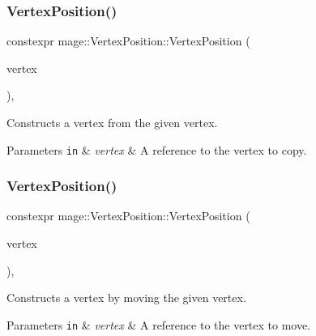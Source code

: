 \subsubsection{\texorpdfstring{Vertex\+Position()}{VertexPosition()}\hspace{0.1cm}{\footnotesize\ttfamily [3/4]}}
{\footnotesize\ttfamily constexpr mage\+::\+Vertex\+Position\+::\+Vertex\+Position (\begin{DoxyParamCaption}\item[{const \hyperlink{structmage_1_1_vertex_position}{Vertex\+Position} \&}]{vertex }\end{DoxyParamCaption})\hspace{0.3cm}{\ttfamily [default]}, {\ttfamily [noexcept]}}

Constructs a vertex from the given vertex.


\begin{DoxyParams}[1]{Parameters}
\mbox{\tt in}  & {\em vertex} & A reference to the vertex to copy. \\
\hline
\end{DoxyParams}
\hypertarget{structmage_1_1_vertex_position_a0198bb4e4d5ec39224a6e9b9dbf52ac0}{}\label{structmage_1_1_vertex_position_a0198bb4e4d5ec39224a6e9b9dbf52ac0} 
\subsubsection{\texorpdfstring{Vertex\+Position()}{VertexPosition()}\hspace{0.1cm}{\footnotesize\ttfamily [4/4]}}
{\footnotesize\ttfamily constexpr mage\+::\+Vertex\+Position\+::\+Vertex\+Position (\begin{DoxyParamCaption}\item[{\hyperlink{structmage_1_1_vertex_position}{Vertex\+Position} \&\&}]{vertex }\end{DoxyParamCaption})\hspace{0.3cm}{\ttfamily [default]}, {\ttfamily [noexcept]}}

Constructs a vertex by moving the given vertex.


\begin{DoxyParams}[1]{Parameters}
\mbox{\tt in}  & {\em vertex} & A reference to the vertex to move. \\
\hline
\end{DoxyParams}
\hypertarget{structmage_1_1_vertex_position_ae78ac5fd76f3217ec72435beaa34ed6e}{}\label{structmage_1_1_vertex_position_ae78ac5fd76f3217ec72435beaa34ed6e} 
